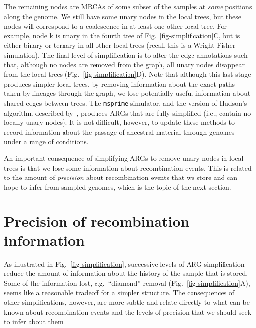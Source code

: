 \documentclass{article}
\newcommand{\noderef}[1]{\textsf{#1}}
\begin{document}
The remaining nodes are MRCAs of some subset of the samples
at \emph{some} positions along the genome. We still have
some unary nodes in the local trees, but these nodes will
correspond to a coalescence in at least one other
local tree. For example, node  \noderef{k} is unary in the fourth tree
of Fig.~\ref{fig-simplification}C, but is either binary
or ternary in all other local trees (recall this is a Wright-Fisher
simulation). The final level of simplification is to alter the edge annotations
such that, although no nodes are removed from the graph, all
unary nodes disappear from the local trees (Fig.~\ref{fig-simplification}D).
Note that although this last stage produces simpler local trees, by
removing information about the exact paths taken by lineages through
the graph, we lose potentially useful information about shared edges
between trees.
The \texttt{msprime} simulator, and the version of Hudson's algorithm described
by~\citet{kelleher2016efficient}, produces ARGs
that are fully simplified (i.e., contain no locally unary nodes).
It is not difficult, however, to update
these methods to record information about the passage of ancestral
material through genomes under a range of conditions.

An important consequence of simplifying ARGs to remove
unary nodes in local trees is that we lose some information
about recombination
events. This is related to the amount of \emph{precision} about
recombination events that we store and
can hope to infer from sampled genomes, which is the topic of the next
section.

\section{Precision of recombination information}
\label{sec-precision}
As illustrated in Fig.~\ref{fig-simplification}, successive levels
of ARG simplification reduce the amount of information about the
history of the sample that is stored. Some of the information lost,
e.g.\ ``diamond'' removal (Fig.~\ref{fig-simplification}A),
seems like a reasonable tradeoff for a simpler structure.
The consequences of other simplifications, however, are
more subtle and relate directly to what can be known about
recombination events and the levels of precision that
we should seek to infer about them.
\end{document}
